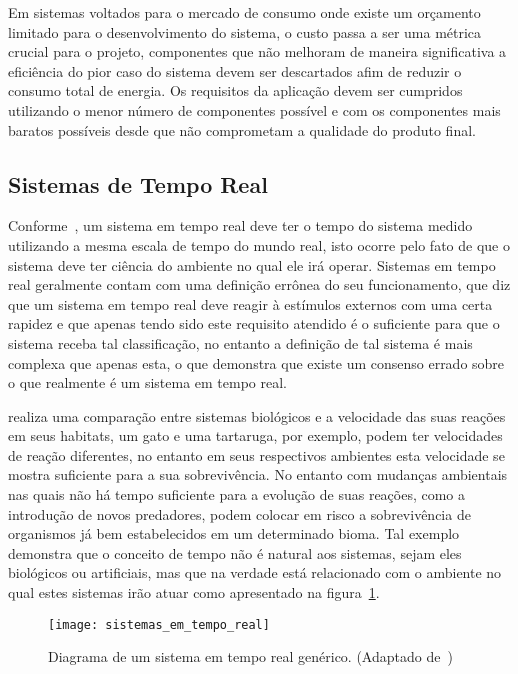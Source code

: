 Em sistemas voltados para o mercado de consumo onde existe um orçamento limitado para o desenvolvimento do sistema, o custo passa a ser uma métrica crucial para o projeto, componentes que não melhoram de maneira significativa a eficiência do pior caso do sistema devem ser descartados afim de reduzir o consumo total de energia. Os requisitos da aplicação devem ser cumpridos utilizando o menor número de componentes possível e com os componentes mais baratos possíveis desde que não comprometam a qualidade do produto final.

\subsection{Sistemas de Tempo Real} %

Conforme~\cite{BUTTAZZO:2011}, um sistema em tempo real deve ter o tempo do sistema medido utilizando a mesma escala de tempo do mundo real, isto ocorre pelo fato de que o sistema deve ter ciência do ambiente no qual ele irá operar. Sistemas em tempo real geralmente contam com uma definição errônea do seu funcionamento, que diz que um sistema em tempo real deve reagir à estímulos externos com uma certa rapidez e que apenas tendo sido este requisito atendido é o suficiente para que o sistema receba tal classificação, no entanto a definição de tal sistema é mais complexa que apenas esta, o que demonstra que existe um consenso errado sobre o que realmente é um sistema em tempo real.

\cite{BUTTAZZO:2011} realiza uma comparação entre sistemas biológicos e a velocidade das suas reações em seus habitats, um gato e uma tartaruga, por exemplo, podem ter velocidades de reação diferentes, no entanto em seus respectivos ambientes esta velocidade se mostra suficiente para a sua sobrevivência. No entanto com mudanças ambientais nas quais não há tempo suficiente para a evolução de suas reações, como a introdução de novos predadores, podem colocar em risco a sobrevivência de organismos já bem estabelecidos em um determinado bioma. Tal exemplo demonstra que o conceito de tempo não é natural aos sistemas, sejam eles biológicos ou artificiais, mas que na verdade está relacionado com o ambiente no qual estes sistemas irão atuar como apresentado na figura~\ref{fig:rt}.

\begin{figure}[h]
	\texttt{[image: sistemas\_em\_tempo\_real]}
    \centering
    \caption{Diagrama de um sistema em tempo real genérico. (Adaptado de~\cite{BUTTAZZO:2011})}
    \label{fig:rt}
\end{figure}


